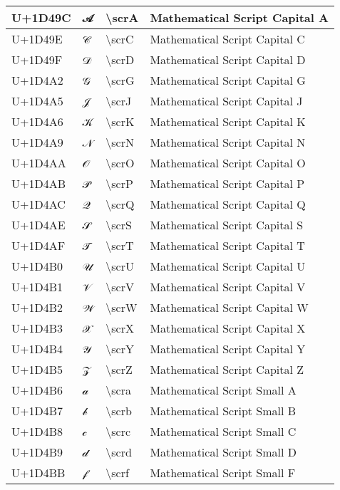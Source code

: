 \begin{table}[h]
\begin{tabulary}{\linewidth}{|L|L|L|L|}
\hline
U+1D49C & 𝒜 & {\textbackslash}scrA & Mathematical Script Capital A \\
\hline
U+1D49E & 𝒞 & {\textbackslash}scrC & Mathematical Script Capital C \\
\hline
U+1D49F & 𝒟 & {\textbackslash}scrD & Mathematical Script Capital D \\
\hline
U+1D4A2 & 𝒢 & {\textbackslash}scrG & Mathematical Script Capital G \\
\hline
U+1D4A5 & 𝒥 & {\textbackslash}scrJ & Mathematical Script Capital J \\
\hline
U+1D4A6 & 𝒦 & {\textbackslash}scrK & Mathematical Script Capital K \\
\hline
U+1D4A9 & 𝒩 & {\textbackslash}scrN & Mathematical Script Capital N \\
\hline
U+1D4AA & 𝒪 & {\textbackslash}scrO & Mathematical Script Capital O \\
\hline
U+1D4AB & 𝒫 & {\textbackslash}scrP & Mathematical Script Capital P \\
\hline
U+1D4AC & 𝒬 & {\textbackslash}scrQ & Mathematical Script Capital Q \\
\hline
U+1D4AE & 𝒮 & {\textbackslash}scrS & Mathematical Script Capital S \\
\hline
U+1D4AF & 𝒯 & {\textbackslash}scrT & Mathematical Script Capital T \\
\hline
U+1D4B0 & 𝒰 & {\textbackslash}scrU & Mathematical Script Capital U \\
\hline
U+1D4B1 & 𝒱 & {\textbackslash}scrV & Mathematical Script Capital V \\
\hline
U+1D4B2 & 𝒲 & {\textbackslash}scrW & Mathematical Script Capital W \\
\hline
U+1D4B3 & 𝒳 & {\textbackslash}scrX & Mathematical Script Capital X \\
\hline
U+1D4B4 & 𝒴 & {\textbackslash}scrY & Mathematical Script Capital Y \\
\hline
U+1D4B5 & 𝒵 & {\textbackslash}scrZ & Mathematical Script Capital Z \\
\hline
U+1D4B6 & 𝒶 & {\textbackslash}scra & Mathematical Script Small A \\
\hline
U+1D4B7 & 𝒷 & {\textbackslash}scrb & Mathematical Script Small B \\
\hline
U+1D4B8 & 𝒸 & {\textbackslash}scrc & Mathematical Script Small C \\
\hline
U+1D4B9 & 𝒹 & {\textbackslash}scrd & Mathematical Script Small D \\
\hline
U+1D4BB & 𝒻 & {\textbackslash}scrf & Mathematical Script Small F \\

\end{tabulary}
\end{table}
